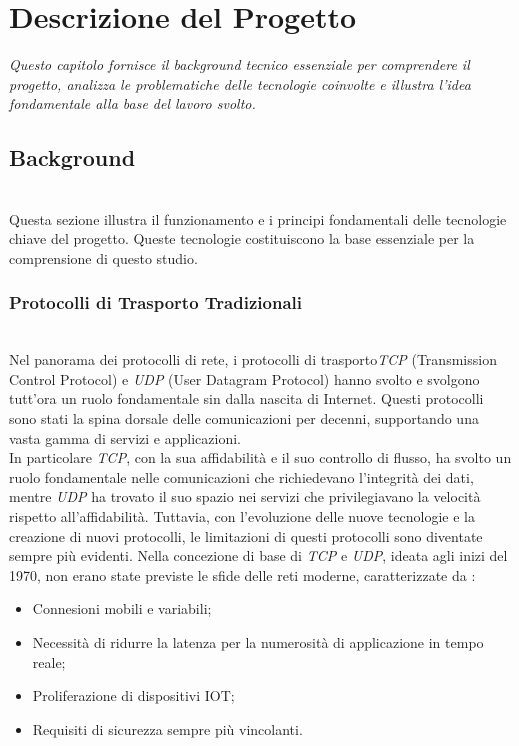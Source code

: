 \chapter{Descrizione del Progetto}
\label{cap:descrizione}

\textit{\indent Questo capitolo fornisce il background tecnico essenziale per comprendere il progetto, analizza le problematiche delle tecnologie coinvolte e illustra l'idea fondamentale alla base del lavoro svolto.}

\section{Background}

~\\
\indent Questa sezione illustra il funzionamento e i principi fondamentali delle tecnologie chiave del progetto.
Queste tecnologie costituiscono la base essenziale per la comprensione di questo studio. 

\subsection{Protocolli di Trasporto Tradizionali}
~\\
\indent Nel panorama dei \gls{protocolli di rete}\glsfirstoccur, i \gls{protocolli di trasporto}\glsfirstoccur \emph{TCP} (Transmission Control Protocol) e \emph{UDP} (User Datagram Protocol) hanno svolto e svolgono tutt'ora un ruolo fondamentale sin dalla nascita di Internet.
Questi protocolli sono stati la spina dorsale delle comunicazioni per decenni, supportando una vasta gamma di servizi e applicazioni.\\
In particolare \emph{TCP}, con la sua affidabilità e il suo controllo di flusso, ha svolto un ruolo fondamentale nelle comunicazioni che richiedevano l'integrità dei dati, mentre \emph{UDP} ha trovato il suo spazio nei servizi che privilegiavano la velocità rispetto all'affidabilità. 
Tuttavia, con l'evoluzione delle nuove tecnologie e la creazione di nuovi protocolli, le limitazioni di questi protocolli sono diventate sempre più evidenti. Nella concezione di base di \emph{TCP} e \emph{UDP}, ideata agli inizi del 1970, non erano state previste le sfide delle reti moderne, 
caratterizzate da :  
\begin{itemize}
    \item Connesioni mobili e variabili;
    
    \item Necessità di ridurre la latenza per la numerosità di applicazione in tempo reale;
    
    \item Proliferazione di dispositivi IOT;
     
    \item Requisiti di sicurezza sempre più vincolanti.
\end{itemize}

